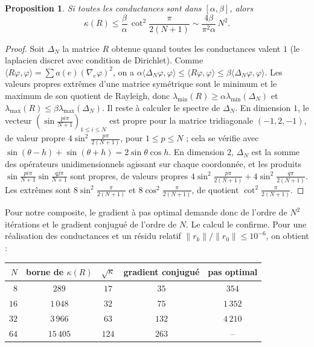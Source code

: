 \documentclass[11pt,a4paper]{article}
\theoremstyle{plain}
\newtheorem{proposition}[theoreme]{Proposition}
\theoremstyle{definition}
\theoremstyle{remark}
\newcommand{\ps}[2]{\langle #1,#2\rangle}
\begin{document}
\begin{proposition}\label{prop:cond}
Si toutes les conductances sont dans $[\alpha,\beta]$, alors
\[
  \kappa(R)\leq\frac\beta\alpha\,\cot^2\frac{\pi}{2(N+1)}\sim\frac{4\beta}{\pi^2\alpha}\,N^2 .
\]
\end{proposition}

\begin{proof}
Soit $\Delta_N$ la matrice $R$ obtenue quand toutes les conductances valent $1$ (le laplacien discret avec condition de Dirichlet). Comme $\ps{R\varphi}{\varphi}=\sum a(e)(\nabla_e\varphi)^2$, on a $\alpha\ps{\Delta_N\varphi}{\varphi}\leq\ps{R\varphi}{\varphi}\leq\beta\ps{\Delta_N\varphi}{\varphi}$. Les valeurs propres extrêmes d'une matrice symétrique sont le minimum et le maximum de son quotient de Rayleigh, donc $\lambda_{\min}(R)\geq\alpha\lambda_{\min}(\Delta_N)$ et $\lambda_{\max}(R)\leq\beta\lambda_{\max}(\Delta_N)$. Il reste à calculer le spectre de $\Delta_N$. En dimension $1$, le vecteur $(\sin\frac{pi\pi}{N+1})_{1\leq i\leq N}$ est propre pour la matrice tridiagonale $(-1,2,-1)$, de valeur propre $4\sin^2\frac{p\pi}{2(N+1)}$, pour $1\leq p\leq N$ ; cela se vérifie avec $\sin(\theta-h)+\sin(\theta+h)=2\sin\theta\cos h$. En dimension $2$, $\Delta_N$ est la somme des opérateurs unidimensionnels agissant sur chaque coordonnée, et les produits $\sin\frac{pi\pi}{N+1}\sin\frac{qj\pi}{N+1}$ sont propres, de valeurs propres $4\sin^2\frac{p\pi}{2(N+1)}+4\sin^2\frac{q\pi}{2(N+1)}$. Les extrêmes sont $8\sin^2\frac{\pi}{2(N+1)}$ et $8\cos^2\frac{\pi}{2(N+1)}$, de quotient $\cot^2\frac\pi{2(N+1)}$.
\end{proof}

Pour notre composite, le gradient à pas optimal demande donc de l'ordre de $N^2$ itérations et le gradient conjugué de l'ordre de $N$. Le calcul le confirme. Pour une réalisation des conductances et un résidu relatif $\|r_k\|/\|r_0\|\leq10^{-6}$, on obtient :

\begin{center}
\begin{tabular}{@{}rcccc@{}}
\toprule
$N$ & borne de $\kappa(R)$ & $\sqrt{\kappa}$ & gradient conjugué & pas optimal \\
\midrule
$8$ & $289$ & $17$ & $35$ & $354$ \\
$16$ & $1\,048$ & $32$ & $75$ & $1\,352$ \\
$32$ & $3\,966$ & $63$ & $132$ & $4\,210$ \\
$64$ & $15\,405$ & $124$ & $263$ & -- \\
\bottomrule
\end{tabular}
\end{center}
\end{document}

